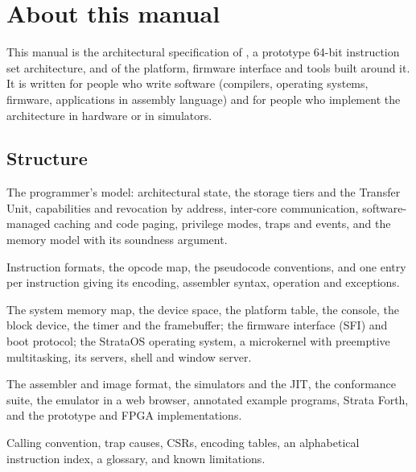 \chapter*{About this manual}

This manual is the architectural specification of \IS, a prototype 64-bit instruction set architecture,
and of the platform, firmware interface and tools built around it. It is written for people who write
\IS software (compilers, operating systems, firmware, applications in assembly language) and for people
who implement the architecture in hardware or in simulators.

\section*{Structure}
\begin{description}[leftmargin=1em,style=nextline]
\item[Part~\ref{part:arch}, Architecture] The programmer's model: architectural state, the storage
  tiers and the Transfer Unit, capabilities and revocation by address, inter-core communication,
  software-managed caching and code paging, privilege modes, traps and events, and the memory model with
  its soundness argument.
\item[Part~\ref{part:isa}, Instruction Set] Instruction formats, the opcode map, the pseudocode
  conventions, and one entry per instruction giving its encoding, assembler syntax, operation and
  exceptions.
\item[Part~\ref{part:platform}, Platform and System Software] The system memory map, the device space,
  the platform table, the console, the block device, the timer and the framebuffer; the firmware
  interface (SFI) and boot protocol; the StrataOS operating system, a microkernel with preemptive
  multitasking, its servers, shell and window server.
\item[Part~\ref{part:tools}, Tools and Implementation] The assembler and image format, the simulators
  and the JIT, the conformance suite, the emulator in a web browser, annotated example programs,
  Strata Forth, and the prototype and FPGA implementations.
\item[Appendices] Calling convention, trap causes, CSRs, encoding tables, an alphabetical instruction
  index, a glossary, and known limitations.
\end{description}

